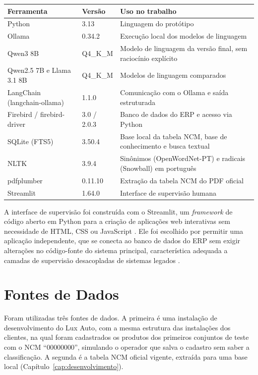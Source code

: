 \begin{quadro}[H]
\centering
\caption{Ferramentas e versões utilizadas}
\label{qua:ferramentas}
\begin{tabular}{|p{4.2cm}|p{2.6cm}|p{7.4cm}|}
\hline
\textbf{Ferramenta} & \textbf{Versão} & \textbf{Uso no trabalho} \\
\hline
Python & 3.13 & Linguagem do protótipo \\
\hline
Ollama & 0.34.2 & Execução local dos modelos de linguagem \\
\hline
Qwen3 8B & Q4\_K\_M & Modelo de linguagem da versão final, sem raciocínio explícito \\
\hline
Qwen2.5 7B e Llama 3.1 8B & Q4\_K\_M & Modelos de linguagem comparados \\
\hline
LangChain (langchain-ollama) & 1.1.0 & Comunicação com o Ollama e saída estruturada \\
\hline
Firebird / firebird-driver & 3.0 / 2.0.3 & Banco de dados do ERP e acesso via Python \\
\hline
SQLite (FTS5) & 3.50.4 & Base local da tabela NCM, base de conhecimento e busca textual \\
\hline
NLTK & 3.9.4 & Sinônimos (OpenWordNet-PT) e radicais (Snowball) em português \\
\hline
pdfplumber & 0.11.10 & Extração da tabela NCM do PDF oficial \\
\hline
Streamlit & 1.64.0 & Interface de supervisão humana \\
\hline
\end{tabular}
\end{quadro}

A interface de supervisão foi construída com o Streamlit, um \textit{framework} de código aberto em Python para a criação de aplicações web interativas sem necessidade de HTML, CSS ou JavaScript \cite{streamlit2024}. Ele foi escolhido por permitir uma aplicação independente, que se conecta ao banco de dados do ERP sem exigir alterações no código-fonte do sistema principal, característica adequada a camadas de supervisão desacopladas de sistemas legados \cite{Madicharla2025HITLllmops,silva2025}.

\section{Fontes de Dados}

Foram utilizadas três fontes de dados. A primeira é uma instalação de desenvolvimento do Lux Auto, com a mesma estrutura das instalações dos clientes, na qual foram cadastrados os produtos dos primeiros conjuntos de teste com o NCM ``00000000'', simulando o operador que salva o cadastro sem saber a classificação. A segunda é a tabela NCM oficial vigente, extraída para uma base local (Capítulo~\ref{cap:desenvolvimento}).

